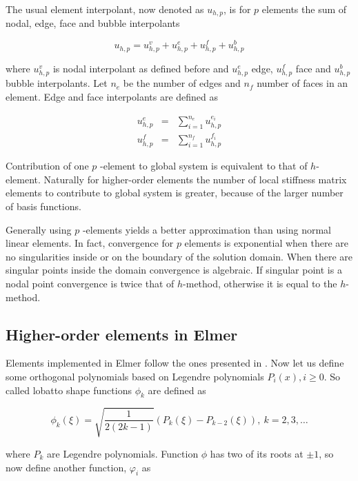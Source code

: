 The usual element interpolant, now denoted as $u_{h,p}$, is for $p$ elements the sum of nodal, edge, face and bubble interpolants

\begin{equation}
 u_{h,p}=u_{h,p}^v+u_{h,p}^e+u_{h,p}^f+u_{h,p}^b
\end{equation}

\noindent where $u_{h,p}^v$ is nodal interpolant as defined before and $u_{h,p}^e$ edge, $u_{h,p}^f$ face and $u_{h,p}^b$ bubble interpolants. Let $n_e$ be the number of edges and $n_f$ number of faces in an element. Edge and face interpolants are defined as

\begin{eqnarray*}
u_{h,p}^e &=& \sum_{i=1}^{n_e} u_{h,p}^{e_i} \\
u_{h,p}^f &=& \sum_{i=1}^{n_f} u_{h,p}^{f_i}
\end{eqnarray*} 

Contribution of one $p$ -element to global system is equivalent to that of $h$-element. Naturally for higher-order elements the number of local stiffness matrix elements to contribute to global system is greater, because of the larger number of basis functions.  

Generally using $p$ -elements yields a better approximation than using normal linear elements. In fact, convergence for $p$ elements is exponential when there are no singularities inside or on the boundary of the solution domain. When there are singular points inside the domain convergence is algebraic. If singular point is a nodal point convergence is twice that of $h$-method, otherwise it is equal to the $h$-method.

\subsection{Higher-order elements in Elmer}

Elements implemented in Elmer follow the ones presented in \cite{SzaboBabu}. Now let us define some orthogonal polynomials based on Legendre polynomials $P_i(x), i\geq 0$. So called lobatto shape functions $\phi_k$ are defined as 

\begin{equation}
\phi_k(\xi)=\sqrt{\frac{1}{2(2k-1)}}(P_{k}(\xi)-P_{k-2}(\xi)),\
k=2,3,\ldots 
\end{equation}

\noindent where $P_k$ are Legendre polynomials. Function $\phi$ has two of its roots at $\pm 1$, so now define another function, $\varphi_i$ as

